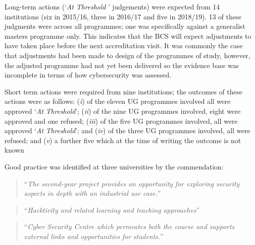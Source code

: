 \documentclass[sigconf]{acmart}
\begin{document}
Long-term actions (`{\emph{At Threshold }}' judgements) were expected from 14 institutions (six in 2015/16, three in 2016/17 and five in 2018/19). 13 of these judgments were across all programmes; one was specifically against a generalist masters programme only. This indicates that the BCS will expect adjustments to have taken place before the next accreditation visit. It was commonly the case that adjustments had been made to design of the programmes of study, however, the adjusted programme had not yet been delivered so the evidence base was incomplete in terms of how cybersecurity was assessed.

Short term actions were required from nine institutions; the outcomes of these actions were as follows: ({\emph{i}}) of the eleven UG programmes involved all were approved `{\emph{At Threshold}}'; ({\emph{ii}}) of the nine UG programmes involved, eight were approved and one refused; ({\emph{iii}}) of the five UG programmes involved, all were approved `{\emph{At Threshold}}'; and ({\emph{iv}}) of the three UG programmes involved, all were refused; and ({\emph{v}}) a further five which at the time of writing the outcome is not known


Good practice was identified at three universities by the commendation:

\begin{quote}
	``{\emph{The second-year project provides an opportunity for exploring security aspects in depth with an industrial use case.}}''
\end{quote}
\begin{quote}
	``{\emph{Hacktivity and related learning and teaching approaches}}''
\end{quote}
\begin{quote}
	``{\emph{Cyber Security Centre which permeates both the course and supports external links and opportunities for students.}}''
\end{quote}
\end{document}
